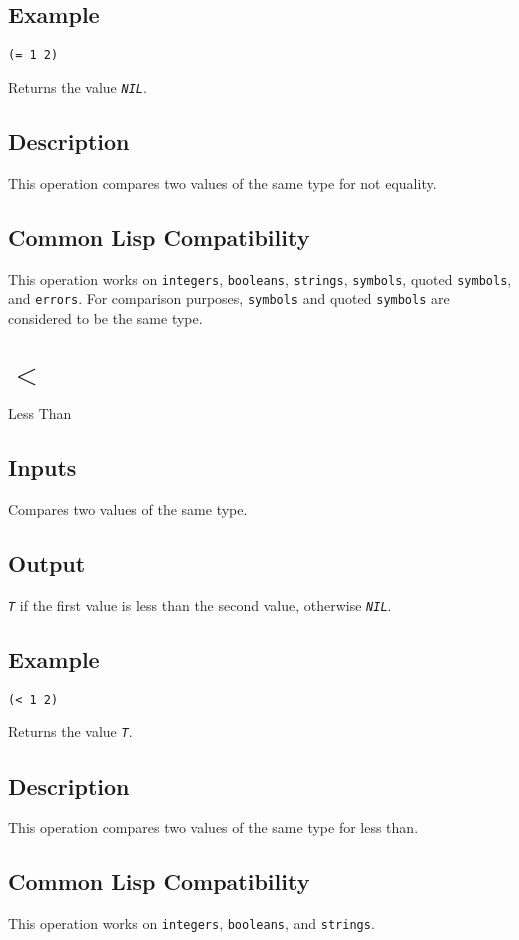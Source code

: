\documentclass[10pt, openany]{book}
\newcommand{\constant}[1]{\emph{\texttt{#1}}}
\newcommand{\datatype}[1]{\texttt{#1}}
\begin{document}
\subsection{Example}
\begin{lstlisting}
(= 1 2)
\end{lstlisting}
Returns the value \constant{NIL}.
\subsection{Description}
This operation compares two values of the same type for not equality.
\subsection{Common Lisp Compatibility}
This operation works on \datatype{integers}, \datatype{booleans}, \datatype{strings}, \datatype{symbols}, quoted \datatype{symbols}, and \datatype{errors}.  For comparison purposes, \datatype{symbols} and quoted \datatype{symbols} are considered to be the same type.

\section{$<$}
Less Than
\subsection{Inputs}
Compares two values of the same type.
\subsection{Output}
\constant{T} if the first value is less than the second value, otherwise \constant{NIL}.
\subsection{Example}
\begin{lstlisting}
(< 1 2)
\end{lstlisting}
Returns the value \constant{T}.
\subsection{Description}
This operation compares two values of the same type for less than.
\subsection{Common Lisp Compatibility}
This operation works on \datatype{integers}, \datatype{booleans}, and \datatype{strings}.
\end{document}
